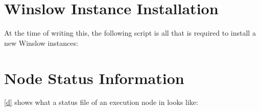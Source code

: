 
\chapter{Winslow Instance Installation}
\label{appendix:winslow_installation}

At the time of writing this, the following script is all that is required to install a new Winslow instances:


\chapter{Node Status Information}
\label{appendix:run_nodes}

\autoref{d} shows what a status file of an execution node in  looks like:


